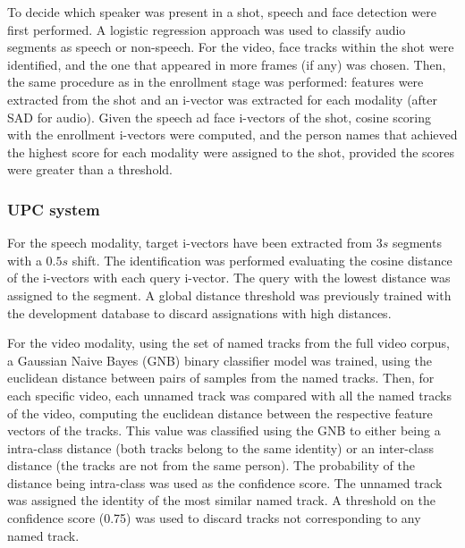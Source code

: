 To decide which speaker was present in a shot, speech and face detection were first  performed. 
A logistic regression approach was used to classify audio segments as speech or non-speech. 
%
For the video, face tracks within the shot were identified, and the one that appeared in more frames (if any) was chosen. 
%
Then, the same procedure as in the enrollment stage was performed: features were extracted from the shot
and an i-vector was extracted for each modality (after SAD for audio).
%
Given the speech ad face i-vectors of the shot, cosine scoring with the enrollment i-vectors were computed, 
and the person names that achieved the highest score for each modality were assigned to the shot, 
provided 
the scores were greater than a threshold.

\subsubsection{UPC system}

For the speech modality, target i-vectors have been extracted from $3s$ segments with a $0.5s$ shift. The identification was performed evaluating the cosine distance of the i-vectors with each query i-vector. The query with the lowest distance was assigned to the segment. A global distance threshold was previously trained with the development database to discard assignations with high distances.

For the video modality, using the set of named tracks from the full video corpus, a Gaussian Naive Bayes (GNB) binary classifier model was trained, using the euclidean distance between pairs of samples from the named tracks. Then, for each specific video, each unnamed track was compared with all the named tracks of the video, computing the euclidean distance between the respective feature vectors of the tracks. This value was classified using the GNB to either being a intra-class distance (both tracks belong to the same identity) or an inter-class distance (the tracks are not from the same person). The probability of the distance being intra-class was used as the confidence score. The unnamed track was assigned the identity of the most similar named track. A threshold on the confidence score (0.75) was used to discard tracks not corresponding to any named track.

\endinput







